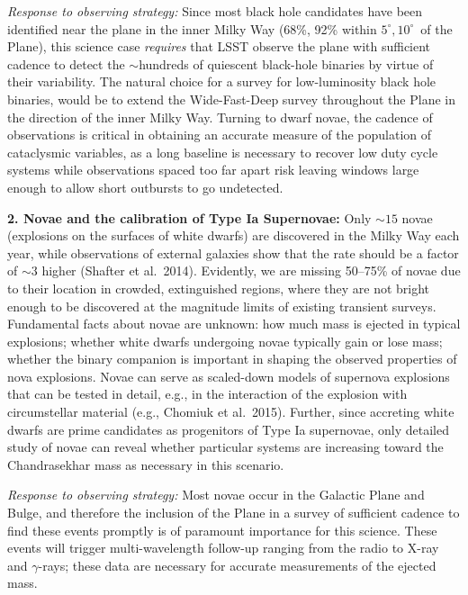 {\it Response to observing strategy:} Since most black hole candidates
have been identified near the plane in the inner Milky Way (68\%, 92\%
within $5^{\circ}, 10^{\circ}$~of the Plane), this science case {\it
    requires} that LSST observe the plane with sufficient cadence to
  detect the $\sim$hundreds of quiescent black-hole binaries by virtue
  of their variability. The natural choice for a survey for
  low-luminosity black hole binaries, would be to extend the
  Wide-Fast-Deep survey throughout the Plane in the direction of the
  inner Milky Way. Turning to dwarf novae, the cadence of observations
  is critical in obtaining an accurate measure of the population of
  cataclysmic variables, as a long baseline is necessary to recover
  low duty cycle systems while observations spaced too far apart risk
  leaving windows large enough to allow short outbursts to go
  undetected.



{\bf 2. Novae and the calibration of Type Ia Supernovae:} Only $\sim
15$ novae (explosions on the surfaces of white dwarfs) are discovered
in the Milky Way each year, while observations of external galaxies
show that the rate should be a factor of $\sim 3$ higher (Shafter et
al.~2014). Evidently, we are missing 50--75\% of novae due to their
location in crowded, extinguished regions, where they are not bright
enough to be discovered at the magnitude limits of existing transient
surveys. Fundamental facts about novae are unknown: how much mass is
ejected in typical explosions; whether white dwarfs undergoing novae
typically gain or lose mass; whether the binary companion is important
in shaping the observed properties of nova explosions. Novae can serve
as scaled-down models of supernova explosions that can be tested in
detail, e.g., in the interaction of the explosion with circumstellar
material (e.g., Chomiuk et al.~2015). Further, since accreting white
dwarfs are prime candidates as progenitors of Type Ia supernovae, only
detailed study of novae can reveal whether particular systems are
increasing toward the Chandrasekhar mass as necessary in this
scenario.

{\it Response to observing strategy:} Most novae occur in the Galactic
Plane and Bulge, and therefore the inclusion of the Plane in a survey
of sufficient cadence to find these events promptly is of paramount
importance for this science. These events will trigger
multi-wavelength follow-up ranging from the radio to X-ray and
$\gamma$-rays; these data are necessary for accurate measurements of
the ejected mass.

